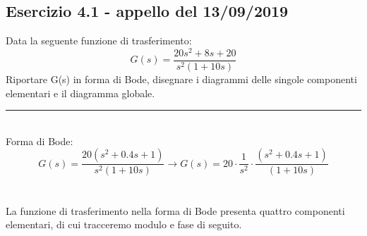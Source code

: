 \documentclass[12pt,a4paper]{article}
\begin{document}
	\subsection*{Esercizio 4.1 - appello del 13/09/2019} Data la seguente funzione di trasferimento:
	\[
		G(s) = \frac{20s^2 + 8s + 20}{s^2(1+10s)}
	\]
	Riportare G(s) in forma di Bode, disegnare i diagrammi delle singole componenti elementari e il diagramma globale.
	\par\noindent\rule{\textwidth}{0.4pt}
	\vspace{5mm}
	\\
	Forma di Bode: 
	\[
		G(s) = \frac{20(s^2 + 0.4s + 1)}{s^2(1+10s)} \rightarrow G(s) = 20 \cdot \frac{1}{s^2} \cdot \frac{(s^2 + 0.4s + 1)}{(1+10s)}
	\]
	\\ \\
	La funzione di trasferimento nella forma di Bode presenta quattro componenti elementari, di cui tracceremo modulo e fase di seguito.\\
\end{document}
